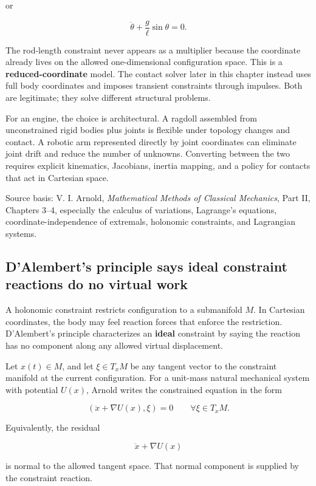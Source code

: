 or

\[
\ddot\theta+\frac{g}{\ell}\sin\theta=0.
\]

The rod-length constraint never appears as a multiplier because the coordinate already lives on the allowed one-dimensional configuration space. This is a \textbf{reduced-coordinate} model. The contact solver later in this chapter instead uses full body coordinates and imposes transient constraints through impulses. Both are legitimate; they solve different structural problems.

For an engine, the choice is architectural. A ragdoll assembled from unconstrained rigid bodies plus joints is flexible under topology changes and contact. A robotic arm represented directly by joint coordinates can eliminate joint drift and reduce the number of unknowns. Converting between the two requires explicit kinematics, Jacobians, inertia mapping, and a policy for contacts that act in Cartesian space.

Source basis: V. I. Arnold, \emph{Mathematical Methods of Classical Mechanics}, Part II, Chapters 3--4, especially the calculus of variations, Lagrange's equations, coordinate-independence of extremals, holonomic constraints, and Lagrangian systems.

\subsection{D'Alembert's principle says ideal constraint reactions do no virtual work}\label{06-engine-ii-ch033-dalemberts-principle-says-ideal-constraint-reactions-do-no-virtual-work}

A holonomic constraint restricts configuration to a submanifold \(M\). In Cartesian coordinates, the body may feel reaction forces that enforce the restriction. D'Alembert's principle characterizes an \textbf{ideal} constraint by saying the reaction has no component along any allowed virtual displacement.

Let \(x(t)\in M\), and let \(\xi\in T_xM\) be any tangent vector to the constraint manifold at the current configuration. For a unit-mass natural mechanical system with potential \(U(x)\), Arnold writes the constrained equation in the form

\[
\left(
\ddot x+\nabla U(x),
\xi
\right)
=
0
\qquad
\forall \xi\in T_xM.
\]

Equivalently, the residual

\[
\ddot x+\nabla U(x)
\]

is normal to the allowed tangent space. That normal component is supplied by the constraint reaction.

